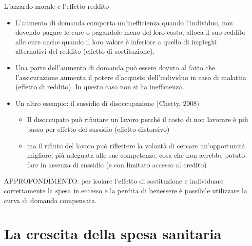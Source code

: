 \documentclass[aspectratio=149,11pt]{beamer}
\begin{document}
\begin{frame}{L'azzardo morale e l'effetto reddito}
\begin{itemize}
\item L'aumento di domanda comporta un'inefficienza quando l'individuo, non
dovendo pagare le cure o pagandole meno del loro costo, alloca il suo
reddito alle cure anche quando il loro valore è inferiore a quello di
impieghi alternativi del reddito (\alert{effetto di sostituzione}).
\item Una parte dell'aumento di domanda può essere dovuto al fatto che
l'assicurazione aumenta il potere d'acquisto dell'individuo in caso di
malattia (\alert{effetto di reddito}). In questo caso non si ha inefficienza.
\item Un altro esempio: il sussidio di disoccupazione (Chetty, 2008)
\begin{itemize}
\item Il disoccupato può rifiutare un lavoro perché il costo di non lavorare è
più basso per effetto del sussidio (effetto distorsivo)
\item ma il rifiuto del lavoro può riflettere la volontà di cercare
un'opportunità migliore, più adeguata alle sue competenze, cosa che non
avrebbe potuto fare in assenza di sussidio (e con limitato accesso al
credito)
\end{itemize}
\end{itemize}

\begin{block}{}
APPROFONDIMENTO: per isolare l'effetto di sostituzione e individuare correttamente
la spesa in eccesso e la perdita di benessere è possibile utilizzare la \alert{curva di domanda compensata}.
\end{block}
\end{frame}

\section{La crescita della spesa sanitaria}
\end{document}
